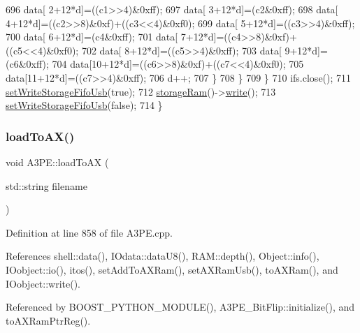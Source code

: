 \begin{DoxyCode}
696           data[ 2+12*d]=((c1>>4)&0xff);
697           data[ 3+12*d]=(c2&0xff);
698           data[ 4+12*d]=((c2>>8)&0xf)+((c3<<4)&0xf0);
699           data[ 5+12*d]=((c3>>4)&0xff);
700           data[ 6+12*d]=(c4&0xff);
701           data[ 7+12*d]=((c4>>8)&0xf)+((c5<<4)&0xf0);
702           data[ 8+12*d]=((c5>>4)&0xff);
703           data[ 9+12*d]=(c6&0xff);
704           data[10+12*d]=((c6>>8)&0xf)+((c7<<4)&0xf0);
705           data[11+12*d]=((c7>>4)&0xff);
706           d++;
707         \}
708       \}
709   \}
710   ifs.close();
711   \hyperlink{classA3PE_aa688f9dff8d2892464fcd13fdf3600ad}{setWriteStorageFifoUsb}(\textcolor{keyword}{true});
712   \hyperlink{classA3PE_af241373059bad4a3c376ab2ac98a7b29}{storageRam}()->\hyperlink{classIOobject_a9f6984bc9f0fadcf800f1be2523ac744}{write}();
713   \hyperlink{classA3PE_aa688f9dff8d2892464fcd13fdf3600ad}{setWriteStorageFifoUsb}(\textcolor{keyword}{false});
714 \}
\end{DoxyCode}
\mbox{\label{classA3PE_a40017b4138705690f8b04e336a7ffcdf}} 
\subsubsection{\texorpdfstring{load\+To\+A\+X()}{loadToAX()}}
{\footnotesize\ttfamily void A3\+P\+E\+::load\+To\+AX (\begin{DoxyParamCaption}\item[{std\+::string}]{filename }\end{DoxyParamCaption})}



Definition at line 858 of file A3\+P\+E.\+cpp.



References shell\+::data(), I\+Odata\+::data\+U8(), R\+A\+M\+::depth(), Object\+::info(), I\+Oobject\+::io(), itos(), set\+Add\+To\+A\+X\+Ram(), set\+A\+X\+Ram\+Usb(), to\+A\+X\+Ram(), and I\+Oobject\+::write().



Referenced by B\+O\+O\+S\+T\+\_\+\+P\+Y\+T\+H\+O\+N\+\_\+\+M\+O\+D\+U\+L\+E(), A3\+P\+E\+\_\+\+Bit\+Flip\+::initialize(), and to\+A\+X\+Ram\+Ptr\+Reg().


